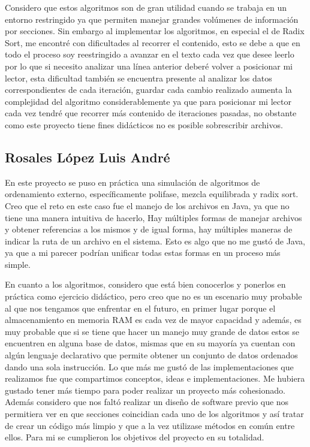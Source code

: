 \documentclass[12pt, letterpaper]{report}
\begin{document}
    Considero que estos algoritmos son de gran utilidad cuando se trabaja en un entorno restringido ya que permiten manejar grandes volúmenes de información por secciones. Sin embargo al implementar los algoritmos, en especial el de Radix Sort, me encontré con dificultades al recorrer el contenido, esto se debe a que en todo el proceso soy reestringido a avanzar en el texto cada vez que desee leerlo por lo que si necesito analizar una línea anterior deberé volver a posicionar mi lector, esta dificultad también se encuentra presente al analizar los datos correspondientes de cada iteración, guardar cada cambio realizado aumenta la complejidad del algoritmo considerablemente ya que para posicionar mi lector cada vez tendré que recorrer más contenido de iteraciones pasadas, no obstante como este proyecto tiene fines didácticos no es posible sobrescribir archivos.
    
    
    
    \subsection*{Rosales López Luis André}
    En este proyecto se puso en práctica una simulación de algoritmos de ordenamiento externo, específicamente polifase, mezcla equilibrada  y radix sort. Creo que el reto en este caso fue el manejo de los archivos en Java, ya que no tiene una manera intuitiva de hacerlo, Hay múltiples formas de manejar archivos y obtener referencias a los mismos y de igual forma, hay múltiples maneras de indicar la ruta de un archivo en el sistema. Esto es algo que no me gustó de Java, ya que a mi parecer podrían unificar todas estas formas en un proceso más simple. 
    
    En cuanto a los algoritmos, considero que está bien conocerlos y ponerlos en práctica como ejercicio didáctico, pero creo que no es un escenario muy probable al que nos tengamos que enfrentar en el futuro, en primer lugar porque el almacenamiento en memoria RAM es cada vez de mayor capacidad y además, es muy probable que si se tiene que hacer un manejo muy grande de datos estos se encuentren en alguna base de datos, mismas que en su mayoría ya cuentan con algún lenguaje declarativo que permite obtener un conjunto de datos ordenados dando una sola instrucción. Lo que más me gustó de las implementaciones que realizamos fue que compartimos conceptos, ideas e implementaciones. Me hubiera gustado tener más tiempo para poder realizar un proyecto más cohesionado. Además considero que nos faltó realizar un diseño de software previo que nos permitiera ver en que secciones coincidian cada uno de los algoritmos y así tratar de crear un código más limpio y que a la vez utilizase métodos en común entre ellos. Para mi se cumplieron los objetivos del proyecto en su totalidad.
    
\end{document}
